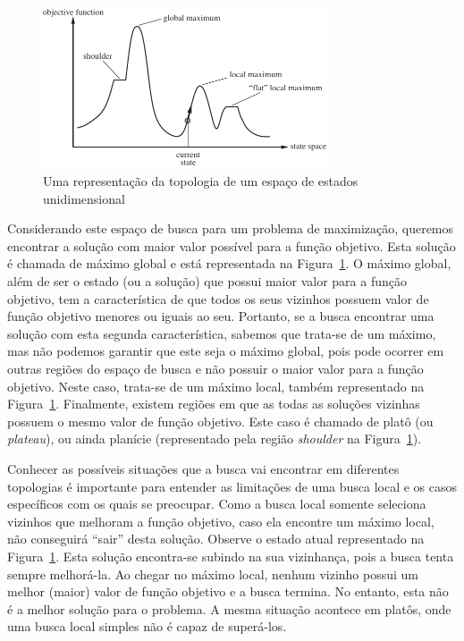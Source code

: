 \begin{figure}[h]
	\centering
	\includegraphics[width=0.75\textwidth]{img/topologia-espaco-busca}
	\caption{Uma representação da topologia de um espaço de estados unidimensional}
	\label{fig:topologia-espaco-busca}
\end{figure}

Considerando este espaço de busca para um problema de maximização, queremos encontrar a solução com maior valor possível para a função objetivo. Esta solução é chamada de máximo global e está representada na Figura~\ref{fig:topologia-espaco-busca}. O máximo global, além de ser o estado (ou a solução) que possui maior valor para a função objetivo, tem a característica de que todos os seus vizinhos possuem valor de função objetivo menores ou iguais ao seu. Portanto, se a busca encontrar uma solução com esta segunda característica, sabemos que trata-se de um máximo, mas não podemos garantir que este seja o máximo global, pois pode ocorrer em outras regiões do espaço de busca e não possuir o maior valor para a função objetivo. Neste caso, trata-se de um máximo local, também representado na Figura~\ref{fig:topologia-espaco-busca}. Finalmente, existem regiões em que as todas as soluções vizinhas possuem o mesmo valor de função objetivo. Este caso é chamado de platô (ou \textit{plateau}), ou ainda planície (representado pela região \textit{shoulder} na Figura~\ref{fig:topologia-espaco-busca}).

Conhecer as possíveis situações que a busca vai encontrar em diferentes topologias é importante para entender as limitações de uma busca local e os casos específicos com os quais se preocupar. Como a busca local somente seleciona vizinhos que melhoram a função objetivo, caso ela encontre um máximo local, não conseguirá ``sair'' desta solução. Observe o estado atual representado na Figura~\ref{fig:topologia-espaco-busca}. Esta solução encontra-se subindo na sua vizinhança, pois a busca tenta sempre melhorá-la. Ao chegar no máximo local, nenhum vizinho possui um melhor (maior) valor de função objetivo e a busca termina. No entanto, esta não é a melhor solução para o problema. A mesma situação acontece em platôs, onde uma busca local simples não é capaz de superá-los.

